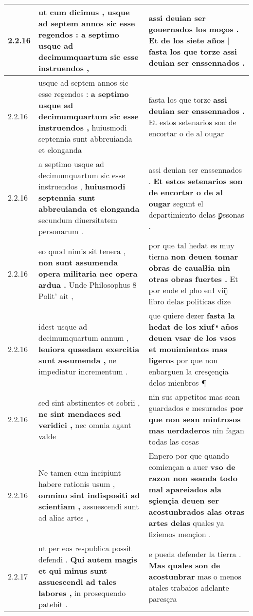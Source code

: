 \begin{tabular}{|p{1cm}|p{6.5cm}|p{6.5cm}|}
2.2.16 & ut cum dicimus , \textbf{ usque ad septem annos sic esse regendos : } a septimo usque ad decimumquartum sic esse instruendos , & assi deuian ser gouernados los moços . \textbf{ Et de los siete años | fasta los que torze } assi deuian ser enssennados . \\\hline
2.2.16 & usque ad septem annos sic esse regendos : \textbf{ a septimo usque ad decimumquartum sic esse instruendos , } huiusmodi septennia sunt abbreuianda et elonganda & fasta los que torze \textbf{ assi deuian ser enssennados . } Et estos setenarios son de encortar o de al ougar \\\hline
2.2.16 & a septimo usque ad decimumquartum sic esse instruendos , \textbf{ huiusmodi septennia sunt abbreuianda et elonganda } secundum diuersitatem personarum . & assi deuian ser enssennados . \textbf{ Et estos setenarios son de encortar o de al ougar } segunt el departimiento delas ꝑssonas . \\\hline
2.2.16 & eo quod nimis sit tenera , \textbf{ non sunt assumenda opera militaria nec opera ardua . } Unde Philosophus 8 Polit’ ait , & por que tal hedat es muy tierna \textbf{ non deuen tomar obras de caualłia nin otras obras fuertes . } Et por ende el pho enł viij̊ libro delas politicas dize \\\hline
2.2.16 & idest usque ad decimumquartum annum , \textbf{ leuiora quaedam exercitia sunt assumenda , } ne impediatur incrementum . & que quiere dezer \textbf{ fasta la hedat de los xiuf ͤ años deuen vsar de los vsos et mouimientos mas ligeros } por que non enbarguen la cresçençia delos mienbros ¶ \\\hline
2.2.16 & sed sint abstinentes et sobrii , \textbf{ ne sint mendaces sed veridici , } nec omnia agant valde & nin sus appetitos mas sean guardados e mesurados \textbf{ por que non sean mintrosos mas uerdaderos } nin fagan todas las cosas \\\hline
2.2.16 & Ne tamen cum incipiunt habere rationis usum , \textbf{ omnino sint indispositi ad scientiam , } assuescendi sunt ad alias artes , & Enpero por que quando comiençan a auer \textbf{ vso de razon non seanda todo mal apareiados ala sçiençia deuen ser acostunbrados alas otras artes delas } quales ya fiziemos mençion . \\\hline
2.2.17 & ut per eos respublica possit defendi . \textbf{ Qui autem magis et qui minus sunt assuescendi ad tales labores , } in prosequendo patebit . & e pueda defender la tierra . \textbf{ Mas quales son de acostunbrar } mas o menos atales trabaios adelante paresçra \\\hline

\end{tabular}

